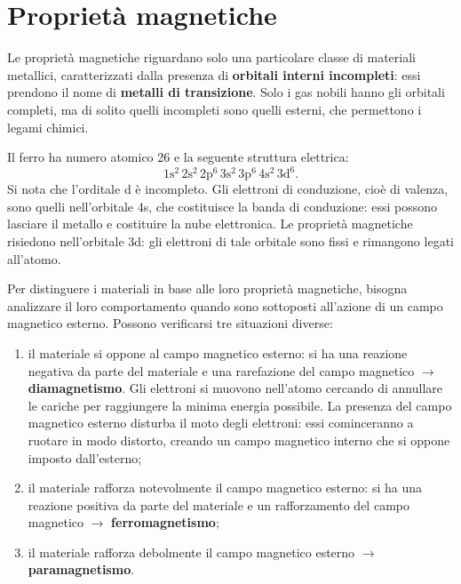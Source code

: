 \setchapterpreamble[u]{\margintoc}
\chapter{Proprietà magnetiche}

Le proprietà magnetiche riguardano solo una particolare classe di materiali metallici, caratterizzati dalla presenza di \textbf{orbitali interni incompleti}: essi prendono il nome di \textbf{metalli di transizione}. Solo i gas nobili hanno gli orbitali completi, ma di solito quelli incompleti sono quelli esterni, che permettono i legami chimici.

Il ferro ha numero atomico 26 e la seguente struttura elettrica: 
\begin{equation*}
    \mathrm{1s^2\, 2s^2\, 2p^6\, 3s^2\, 3p^6\, 4s^2\, 3d^6}.
\end{equation*}
Si nota che l’orditale d è incompleto.
Gli elettroni di conduzione, cioè di valenza, sono quelli nell’orbitale 4s, che costituisce la banda di conduzione: essi possono lasciare il metallo e costituire la nube elettronica.
Le proprietà magnetiche risiedono nell’orbitale 3d: gli elettroni di tale orbitale sono fissi e rimangono legati all’atomo.

Per distinguere i materiali in base alle loro proprietà magnetiche, bisogna analizzare il loro comportamento quando sono sottoposti all’azione di un campo magnetico esterno. Possono verificarsi tre situazioni diverse:
\begin{enumerate}
    \item il materiale si oppone al campo magnetico esterno: si ha una reazione negativa da parte del materiale e una rarefazione del campo magnetico $\to$ \textbf{diamagnetismo}. Gli elettroni si muovono nell’atomo cercando di annullare le cariche per raggiungere la minima energia possibile. La presenza del campo magnetico esterno disturba il moto degli elettroni: essi cominceranno a ruotare in modo distorto, creando un campo magnetico interno che si oppone imposto dall’esterno;
    \item il materiale rafforza notevolmente il campo magnetico esterno: si ha una reazione positiva da parte del materiale e un rafforzamento del campo magnetico $\to$ \textbf{ferromagnetismo};
    \item il materiale rafforza debolmente il campo magnetico esterno $\to$ \textbf{paramagnetismo}.
\end{enumerate}

